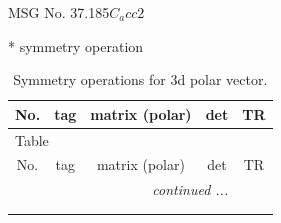 \documentclass[fleqn,8pt]{jsarticle}
\begin{document}
\setcounter{MaxMatrixCols}{32}

\renewcommand{\tablename}{Table~}
\renewcommand{\figurename}{Figure~}
\begin{center}
\LARGE
MSG No. 37.185\quad$C_{a}cc2$
\end{center}
* symmetry operation
\renewcommand{\arraystretch}{1.3}
\begin{longtable}{ccccc}
\caption{Symmetry operations for 3d polar vector.}
 \\
 \hline \hline
No. & tag & matrix (polar) & det & TR \\ \hline \endfirsthead

\multicolumn{4}{l}{\tablename\ \thetable{}} \\
 \hline \hline
No. & tag & matrix (polar) & det & TR \\ \hline \endhead

 \hline \hline
\multicolumn{4}{r}{\footnotesize\it continued ...} \\ \endfoot

 \hline \hline
\multicolumn{4}{r}{} \\ \endlastfoot


\end{longtable}
\end{document}
